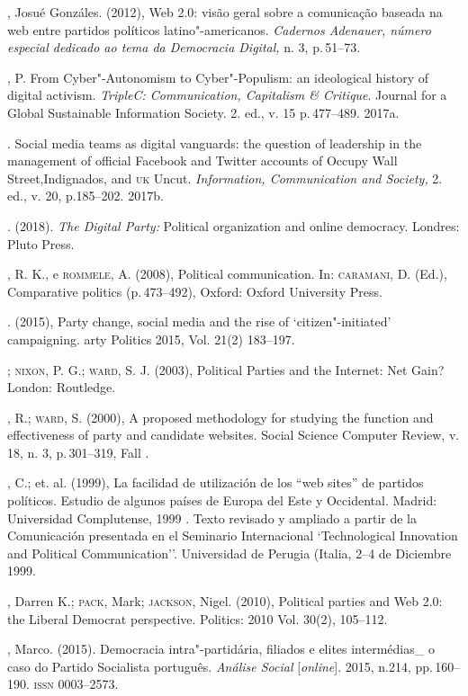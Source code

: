 \begin{bibliohedra}
, Josué Gonzáles. (2012), Web 2.0: visão geral sobre a
comunicação baseada na web entre partidos políticos latino"-americanos.
\emph{Cadernos Adenauer, número especial dedicado ao tema da Democracia
Digital,} n. 3, p.\,51--73.

, P. From Cyber"-Autonomism to Cyber"-Populism: an ideological
history of digital activism. \emph{TripleC: Communication, Capitalism \&
Critique}. Journal for a Global Sustainable Information Society. 2. ed.,
v. 15 p.\,477--489. 2017a.

\titidem. Social media teams as digital vanguards: the question of
leadership in the management of official Facebook and Twitter accounts
of Occupy Wall Street,Indignados, and \textsc{uk} Uncut. \emph{Information,
Communication and Society,} 2. ed., v. 20, p.185--202. 2017b.

\titidem. (2018). \emph{The Digital Party:} Political organization
and online democracy. Londres: Pluto Press.

, R. K., e \textsc{rommele}, A. (2008), Political communication. In:
\textsc{caramani}, D. (Ed.), Comparative politics (p.\,473--492), Oxford: Oxford
University Press.

\titidem. (2015), Party change, social media and the rise of
`citizen"-initiated' campaigning. arty Politics 2015, Vol. 21(2)
183--197.

\titidem; \textsc{nixon}, P. G.; \textsc{ward}, S. J. (2003), Political Parties and the Internet: Net Gain? London: Routledge.

, R.; \textsc{ward}, S. (2000), A proposed methodology for studying the
function and effectiveness of party and candidate websites. Social
Science Computer Review, v. 18, n. 3, p.\,301--319, Fall .

, C.; et. al. (1999), La facilidad de utilización de los ``web
sites'' de partidos políticos. Estudio de algunos países de Europa del
Este y Occidental. Madrid: Universidad Complutense, 1999 . Texto
revisado y ampliado a partir de la Comunicación presentada en el
Seminario Internacional `Technological Innovation and Political
Communication''. Universidad de Perugia (Italia, 2--4 de Diciembre 1999.

, Darren K.; \textsc{pack}, Mark; \textsc{jackson}, Nigel. (2010), Political
parties and Web 2.0: the Liberal Democrat perspective. Politics: 2010
Vol. 30(2), 105--112.

, Marco. (2015). Democracia intra"-partidária, filiados e elites
intermédias\_ o caso do Partido Socialista português. \emph{Análise
Social} {[}\emph{online}{]}. 2015, n.214, pp.\,160--190. \textsc{issn} 0003--2573.


\end{bibliohedra}
